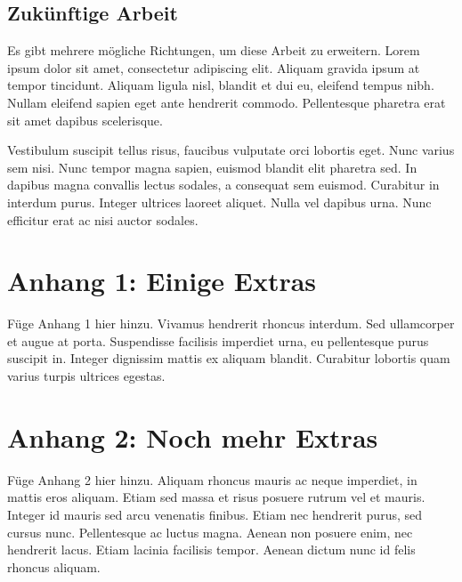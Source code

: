 \documentclass[listof=totoc,index=totoc,bibliography=totoc,12pt,ngerman,a4paper,]{report}
\begin{document}
\section{Zukünftige Arbeit}\label{zukuxfcnftige-arbeit}

Es gibt mehrere mögliche Richtungen, um diese Arbeit zu erweitern. Lorem
ipsum dolor sit amet, consectetur adipiscing elit. Aliquam gravida ipsum
at tempor tincidunt. Aliquam ligula nisl, blandit et dui eu, eleifend
tempus nibh. Nullam eleifend sapien eget ante hendrerit commodo.
Pellentesque pharetra erat sit amet dapibus scelerisque.

Vestibulum suscipit tellus risus, faucibus vulputate orci lobortis eget.
Nunc varius sem nisi. Nunc tempor magna sapien, euismod blandit elit
pharetra sed. In dapibus magna convallis lectus sodales, a consequat sem
euismod. Curabitur in interdum purus. Integer ultrices laoreet aliquet.
Nulla vel dapibus urna. Nunc efficitur erat ac nisi auctor sodales.

\chapter*{Anhang 1: Einige Extras}\label{anhang-1-einige-extras}


Füge Anhang 1 hier hinzu. Vivamus hendrerit rhoncus interdum. Sed
ullamcorper et augue at porta. Suspendisse facilisis imperdiet urna, eu
pellentesque purus suscipit in. Integer dignissim mattis ex aliquam
blandit. Curabitur lobortis quam varius turpis ultrices egestas.

\chapter*{Anhang 2: Noch mehr Extras}\label{anhang-2-noch-mehr-extras}


Füge Anhang 2 hier hinzu. Aliquam rhoncus mauris ac neque imperdiet, in
mattis eros aliquam. Etiam sed massa et risus posuere rutrum vel et
mauris. Integer id mauris sed arcu venenatis finibus. Etiam nec
hendrerit purus, sed cursus nunc. Pellentesque ac luctus magna. Aenean
non posuere enim, nec hendrerit lacus. Etiam lacinia facilisis tempor.
Aenean dictum nunc id felis rhoncus aliquam.

\footnotesize
\singlespacing
\setlength{\parindent}{0in}
\end{document}
